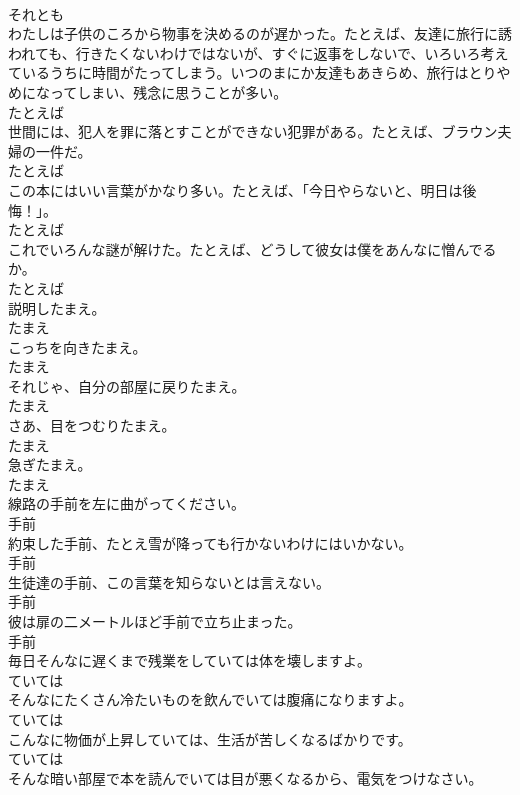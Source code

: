 \documentclass[8pt]{extreport}
\begin{document}
\begin{CJK}{UTF8}{min}
\\	それとも
\\	わたしは子供のころから物事を決めるのが遅かった。たとえば、友達に旅行に誘われても、行きたくないわけではないが、すぐに返事をしないで、いろいろ考えているうちに時間がたってしまう。いつのまにか友達もあきらめ、旅行はとりやめになってしまい、残念に思うことが多い。	
\\	たとえば
\\	世間には、犯人を罪に落とすことができない犯罪がある。たとえば、ブラウン夫婦の一件だ。	
\\	たとえば
\\	この本にはいい言葉がかなり多い。たとえば、「今日やらないと、明日は後悔！」。	
\\	たとえば
\\	これでいろんな謎が解けた。たとえば、どうして彼女は僕をあんなに憎んでるか。	
\\	たとえば
\\	説明したまえ。	
\\	たまえ
\\	こっちを向きたまえ。	
\\	たまえ
\\	それじゃ、自分の部屋に戻りたまえ。	
\\	たまえ
\\	さあ、目をつむりたまえ。	
\\	たまえ
\\	急ぎたまえ。	
\\	たまえ
\\	線路の手前を左に曲がってください。	
\\	手前
\\	約束した手前、たとえ雪が降っても行かないわけにはいかない。	
\\	手前
\\	生徒達の手前、この言葉を知らないとは言えない。	
\\	手前
\\	彼は扉の二メートルほど手前で立ち止まった。	
\\	手前
\\	毎日そんなに遅くまで残業をしていては体を壊しますよ。	
\\	ていては
\\	そんなにたくさん冷たいものを飲んでいては腹痛になりますよ。	
\\	ていては
\\	こんなに物価が上昇していては、生活が苦しくなるばかりです。	
\\	ていては
\\	そんな暗い部屋で本を読んでいては目が悪くなるから、電気をつけなさい。	

\end{CJK}
\end{document}
